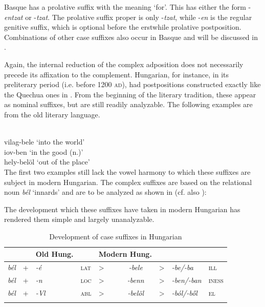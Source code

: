 Basque has a prolative suffix with the meaning ‘for’. This has either the form -\textit{entzat} or -\textit{tzat}. The prolative suffix proper is only -\textit{tzat}, while -\textit{en} is the regular genitive suffix, which is optional before the erstwhile prolative postposition. Combinations of other case suffixes also occur in Basque and will be discussed in .

Again, the internal reduction of the complex adposition does not necessarily precede its affixation to the complement. Hungarian, for instance, in its preliterary period (i.e. before 1200 \textsc{ad}), had postpositions constructed exactly like the Quechua ones in . From the beginning of the literary tradition, these appear as nominal suffixes, but are still readily analyzable. The following examples are from the old literary language.

\ea\label{ex:E58}
\\
 \ea vilag-bele  
 \glt ‘into the world’\\
\ex iov-ben
\glt ‘in the good (n.)’\\
\ex hely-belöl 
\glt ‘out of the place’\\
\z
\z
\noindent The first two examples still lack the vowel harmony to which these suffixes are subject in modern Hungarian. The complex suffixes are based on the relational noun \textit{bél} ‘innards’ and are to be analyzed as shown in  (cf. also \citealt[118--121]{Kahr1976}):

The development which these suffixes have taken in modern Hungarian has rendered them simple and largely unanalyzable.

\begin{table}
\begin{tabular}{lllllclll}
\lsptoprule
\multicolumn{4}{l}{components} &  & Old Hung. &  & \multicolumn{2}{l}{Modern Hung.}\\
\midrule
\itshape bél & + & \itshape {}-é & \textsc{lat}{}{} & {\textgreater} & \itshape {}-bele & {\textgreater} & \itshape {}-be/-ba & \scshape ill\\
\itshape bél & + & \itshape {}-n & \textsc{loc}{}{} & {\textgreater} & \itshape {}-benn & {\textgreater} & \itshape {}-ben/-ban & \scshape iness\\
\itshape bél & + & \itshape {}-Vl & \textsc{abl}{}{} & {\textgreater} & \itshape {}-belöl & {\textgreater} & \itshape {}-ból/-ből & \scshape el\\
\lspbottomrule
\end{tabular}
\caption{Development of case suffixes in Hungarian}\label{tab:DevHung}
\end{table}



